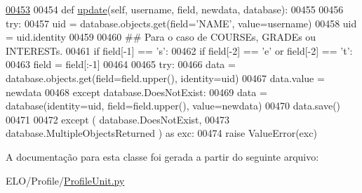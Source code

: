 \begin{DoxyCode}
\hypertarget{classProfile_1_1ProfileUnit_1_1PersProfile_l00453}{}\hyperlink{classProfile_1_1ProfileUnit_1_1PersProfile_af1e4b3cf0eee0a14b5113210503ff665}{00453} 
00454     \textcolor{keyword}{def }\hyperlink{classProfile_1_1ProfileUnit_1_1PersProfile_af1e4b3cf0eee0a14b5113210503ff665}{update}(self, username, field, newdata, database):
00455         
00456         \textcolor{keywordflow}{try}:
00457             uid = database.objects.get(field=\textcolor{stringliteral}{'NAME'}, value=username)
00458             uid = uid.identity
00459 
00460             \textcolor{comment}{## Para o caso de COURSEs, GRADEs ou INTERESTs.}
00461             \textcolor{keywordflow}{if} field[-1] == \textcolor{stringliteral}{'s'}:
00462                 \textcolor{keywordflow}{if} field[-2] == \textcolor{stringliteral}{'e'} \textcolor{keywordflow}{or} field[-2] == \textcolor{stringliteral}{'t'}:
00463                     field = field[:-1]
00464                 
00465             \textcolor{keywordflow}{try}:
00466                 data = database.objects.get(field=field.upper(), identity=uid)
00467                 data.value = newdata
00468             \textcolor{keywordflow}{except} database.DoesNotExist:
00469                 data = database(identity=uid, field=field.upper(), value=newdata)
00470             data.save()
00471 
00472         \textcolor{keywordflow}{except} ( database.DoesNotExist, 
00473                  database.MultipleObjectsReturned ) \textcolor{keyword}{as} exc:
00474             \textcolor{keywordflow}{raise} ValueError(exc)
\end{DoxyCode}


A documentação para esta classe foi gerada a partir do seguinte arquivo\-:\begin{DoxyCompactItemize}
\item 
E\-L\-O/\-Profile/\hyperlink{ProfileUnit_8py}{Profile\-Unit.\-py}\end{DoxyCompactItemize}
